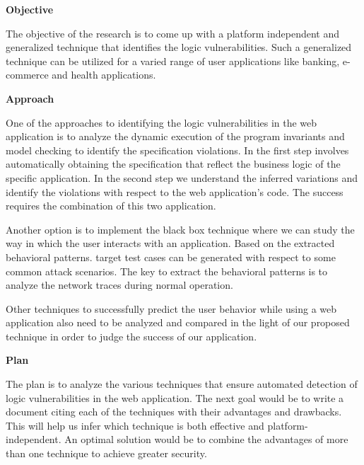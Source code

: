 \documentclass[11pt]{article}
\begin{document}
\textbf{Objective}

The objective of the research is to come up with a platform independent and generalized technique that identifies the logic vulnerabilities. Such a generalized technique can be utilized for a varied range of user applications like banking, e-commerce and health applications.

\textbf{Approach}

One of the approaches to identifying the logic vulnerabilities in the web application is to analyze the dynamic execution of the program invariants and model checking to identify the specification violations. In the first step involves automatically obtaining the specification that reflect the business logic of the specific application. In the second step we understand the inferred variations and identify the violations with respect to the web application's code. The success requires the combination of this two application.

Another option is to implement the black box technique where we can study the way in which the user interacts with an application. Based on the extracted behavioral patterns. target test cases can be generated with respect to some common attack scenarios. The key to extract the behavioral patterns is to analyze the network traces during normal operation.

Other techniques to successfully predict the user behavior while using a web application also need to be analyzed and compared in the light of our proposed technique in order to judge the success of our application.  

\textbf{Plan}

The plan is to analyze the various techniques that ensure automated detection of logic vulnerabilities in the web application. The next goal would be to write a document citing each of the techniques with their advantages and drawbacks. This will help us infer which technique is both effective and platform-independent. An optimal solution would be to combine the advantages of more than one technique to achieve greater security. 
\end{document}
